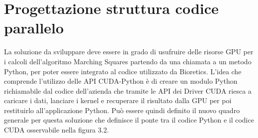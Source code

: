\documentclass[12pt,a4paper]{report}
\begin{document}
\newpage
\section{Progettazione struttura codice parallelo}
La soluzione da sviluppare deve essere in grado di usufruire delle risorse GPU per i calcoli dell'algoritmo Marching Squares partendo da una chiamata a un metodo Python, per poter essere integrato al codice utilizzato da Bioretics. \newline
L'idea che comprende l'utilizzo delle API CUDA-Python è di creare un modulo Python richiamabile dal codice dell'azienda che tramite le API dei Driver CUDA riesca a caricare i dati, lanciare i kernel e recuperare il risultato dalla GPU per poi restituirlo all'applicazione Python. \newline
Può essere quindi definito il nuovo quadro generale per questa soluzione che definisce il ponte tra il codice Python e il codice CUDA osservabile nella figura 3.2. \\[10pt]

\begin{figure}[H]
\centering
\begin{floatrow}[1]
\end{floatrow}
\end{figure} \newpage
\end{document}
